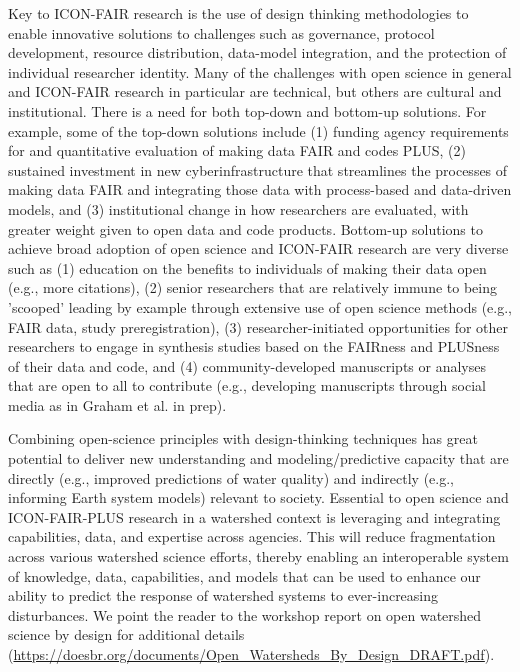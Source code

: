 \documentclass[preprint,review, 12pt]{elsarticle}
\begin{document}
 Key to ICON-FAIR research is the use of design thinking methodologies to enable innovative solutions to challenges such as governance, protocol development, resource distribution, data-model integration, and the protection of individual researcher identity. Many of the challenges with open science in general and ICON-FAIR research in particular are technical, but others are cultural and institutional. There is a need for both top-down and bottom-up solutions. For example, some of the top-down solutions include (1) funding agency requirements for and quantitative evaluation of making data FAIR and codes PLUS, (2) sustained investment in new cyberinfrastructure that streamlines the processes of making data FAIR and integrating those data with process-based and data-driven models, and (3) institutional change in how researchers are evaluated, with greater weight given to open data and code products. Bottom-up solutions to achieve broad adoption of open science and ICON-FAIR research are very diverse such as (1) education on the benefits to individuals of making their data open (e.g., more citations), (2) senior researchers that are relatively immune to being 'scooped' leading by example through extensive use of open science methods (e.g., FAIR data, study preregistration), (3) researcher-initiated opportunities for other researchers to engage in synthesis studies based on the FAIRness and PLUSness of their data and code, and (4) community-developed manuscripts or analyses that are open to all to contribute (e.g., developing manuscripts through social media as in Graham et al. in prep).  
 
 Combining open-science principles with design-thinking techniques has great potential to deliver new understanding and modeling/predictive capacity that are directly (e.g., improved predictions of water quality) and indirectly (e.g., informing Earth system models) relevant to society. Essential to open science and ICON-FAIR-PLUS research in a watershed context is leveraging and integrating capabilities, data, and expertise across agencies. This will reduce fragmentation across various watershed science efforts, thereby enabling an interoperable system of knowledge, data, capabilities, and models that can be used to enhance our ability to predict the response of watershed systems to ever-increasing disturbances. We point the reader to the workshop report on open watershed science by design for additional details (\url{https://doesbr.org/documents/Open_Watersheds_By_Design_DRAFT.pdf}).
    
\end{document}

